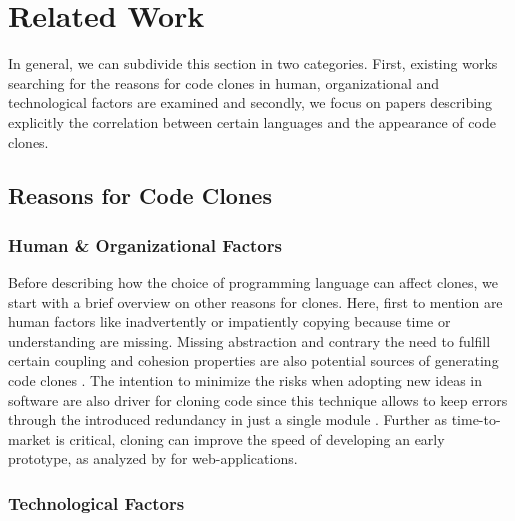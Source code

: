 
\section{Related Work}
\label{sec:related_work}

In general, we can subdivide this section in two categories. First, existing works searching for the reasons for code clones in human, organizational and technological factors are examined and secondly, we focus on papers describing explicitly the correlation between certain languages and the appearance of code clones.

\subsection{Reasons for Code Clones}

\subsubsection{Human \& Organizational Factors}

Before describing how the choice of programming language can affect clones, we start with a brief overview on other reasons for clones. Here, first to mention are human factors like inadvertently or impatiently copying because time or understanding are missing. Missing abstraction and contrary the need to fulfill certain coupling and cohesion properties are also potential sources of generating code clones \cite{kasper2006cloning}.
The intention to minimize the risks when adopting new ideas in software are also driver for cloning code since this technique allows to keep errors through the introduced redundancy in just a single module \cite{cordy2003comprehending}. Further as time-to-market is critical, cloning can improve the speed of developing an early prototype, as analyzed by \cite{rajapakse2007using} for web-applications.

\subsubsection{Technological Factors}

